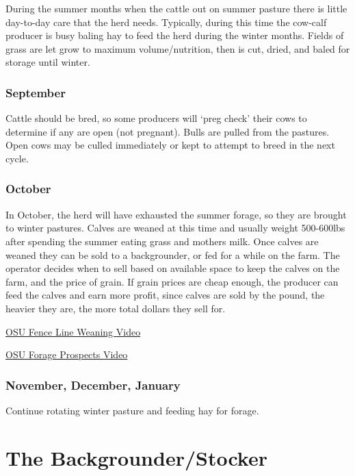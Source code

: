 \documentclass[
  letterpaper,
  DIV=11,
  numbers=noendperiod]{scrreprt}
\begin{document}
During the summer months when the cattle out on summer pasture there is
little day-to-day care that the herd needs. Typically, during this time
the cow-calf producer is busy baling hay to feed the herd during the
winter months. Fields of grass are let grow to maximum volume/nutrition,
then is cut, dried, and baled for storage until winter.

\hypertarget{september}{%
\subsubsection{September}\label{september}}

Cattle should be bred, so some producers will `preg check' their cows to
determine if any are open (not pregnant). Bulls are pulled from the
pastures. Open cows may be culled immediately or kept to attempt to
breed in the next cycle.

\hypertarget{october}{%
\subsubsection{October}\label{october}}

In October, the herd will have exhausted the summer forage, so they are
brought to winter pastures. Calves are weaned at this time and usually
weight 500-600lbs after spending the summer eating grass and mothers
milk. Once calves are weaned they can be sold to a backgrounder, or fed
for a while on the farm. The operator decides when to sell based on
available space to keep the calves on the farm, and the price of grain.
If grain prices are cheap enough, the producer can feed the calves and
earn more profit, since calves are sold by the pound, the heavier they
are, the more total dollars they sell for.

\href{https://www.youtube.com/watch?v=qpGuOOA-fYU}{OSU Fence Line
Weaning Video}

\href{https://www.youtube.com/watch?v=JyvTl9PVdMQ\#action=share}{OSU
Forage Prospects Video}

\hypertarget{november-december-january}{%
\subsubsection{November, December,
January}\label{november-december-january}}

Continue rotating winter pasture and feeding hay for forage.

\hypertarget{the-backgrounderstocker}{%
\section{The Backgrounder/Stocker}\label{the-backgrounderstocker}}
\end{document}
